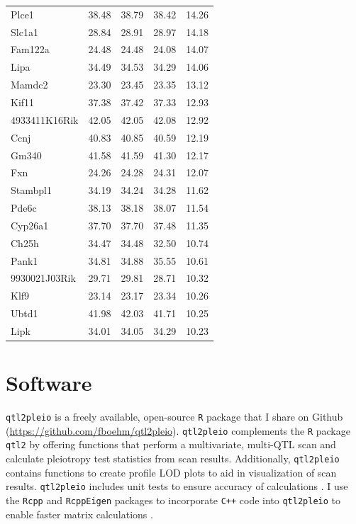 \documentclass[oneside]{book}\usepackage[]{graphicx}\usepackage[]{color}
\begin{document}
{\begin{longtable}{lrrrr}
  Plce1 & 38.48 & 38.79 & 38.42 & 14.26 \\
  Slc1a1 & 28.84 & 28.91 & 28.97 & 14.18 \\
  Fam122a & 24.48 & 24.48 & 24.08 & 14.07 \\
  Lipa & 34.49 & 34.53 & 34.29 & 14.06 \\
  Mamdc2 & 23.30 & 23.45 & 23.35 & 13.12 \\
  Kif11 & 37.38 & 37.42 & 37.33 & 12.93 \\
  4933411K16Rik & 42.05 & 42.05 & 42.08 & 12.92 \\
  Ccnj & 40.83 & 40.85 & 40.59 & 12.19 \\
  Gm340 & 41.58 & 41.59 & 41.30 & 12.17 \\
  Fxn & 24.26 & 24.28 & 24.31 & 12.07 \\
  Stambpl1 & 34.19 & 34.24 & 34.28 & 11.62 \\
  Pde6c & 38.13 & 38.18 & 38.07 & 11.54 \\
  Cyp26a1 & 37.70 & 37.70 & 37.48 & 11.35 \\
  Ch25h & 34.47 & 34.48 & 32.50 & 10.74 \\
  Pank1 & 34.81 & 34.88 & 35.55 & 10.61 \\
  9930021J03Rik & 29.71 & 29.81 & 28.71 & 10.32 \\
  Klf9 & 23.14 & 23.17 & 23.34 & 10.26 \\
  Ubtd1 & 41.98 & 42.03 & 41.71 & 10.25 \\
  Lipk & 34.01 & 34.05 & 34.29 & 10.23 \\
   \hline
\end{longtable}
}







\chapter{Software}\label{sec:software}

\texttt{qtl2pleio} is a freely available, open-source \texttt{R} \citep{r} package that I share on Github (\url{https://github.com/fboehm/qtl2pleio}). \texttt{qtl2pleio} complements the \texttt{R} package \texttt{qtl2} \citep{broman2019rqtl2} by offering functions that perform a multivariate, multi-QTL scan and calculate pleiotropy test statistics from scan results. Additionally, \texttt{qtl2pleio} contains functions to create profile LOD plots to aid in visualization of scan results. \texttt{qtl2pleio} includes unit tests to ensure accuracy of calculations \citep{wickham2011testthat}. I use the \texttt{Rcpp} and \texttt{RcppEigen} packages to incorporate \texttt{C++} code into \texttt{qtl2pleio} to enable faster matrix calculations \citep{eddelbuettel2011rcpp,bates2013fast}.
\end{document}
